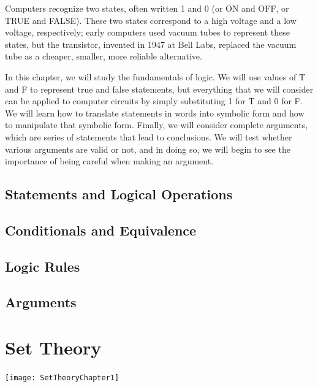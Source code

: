 \documentclass[9pt,letter,twoside,openright]{memoir}
\begin{document}
Computers recognize two states, often written 1 and 0 (or ON and OFF, or TRUE and FALSE).  These two states correspond to a high voltage and a low voltage, respectively; early computers used vacuum tubes to represent these states, but the transistor, invented in 1947 at Bell Labs, replaced the vacuum tube as a cheaper, smaller, more reliable alternative.

In this chapter, we will study the fundamentals of logic.  We will use values of T and F to represent true and false statements, but everything that we will consider can be applied to computer circuits by simply substituting 1 for T and 0 for F.  We will learn how to translate statements in words into symbolic form and how to manipulate that symbolic form.  Finally, we will consider complete arguments, which are series of statements that lead to conclusions.  We will test whether various arguments are valid or not, and in doing so, we will begin to see the importance of being careful when making an argument.
\vfill
\pagebreak

\section{Statements and Logical Operations}


\section{Conditionals and Equivalence}


\section{Logic Rules}


\section{Arguments}


\chapter{Set Theory}
\begin{center}\texttt{[image: SetTheoryChapter1]}\end{center}
\end{document}
